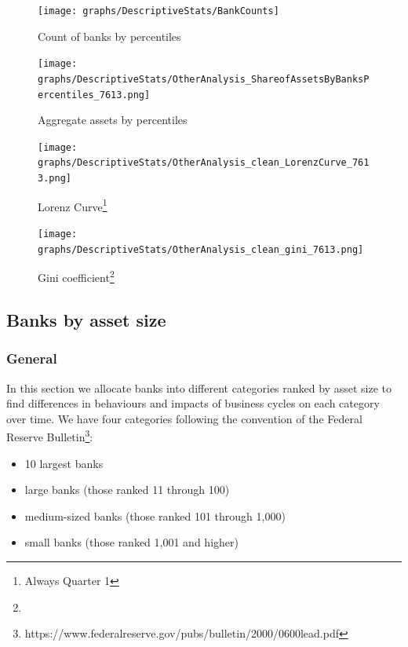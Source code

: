 \documentclass[12pt, a4paper]{article} %
\begin{document}
\begin{figure}[hbtp]
\centering
\caption{Count of banks by percentiles}
\texttt{[image: graphs/DescriptiveStats/BankCounts]}
\label{table:assetsByPercentiles}
\end{figure}


\begin{figure}[hbtp]
\centering
\caption{Aggregate assets by percentiles}
\texttt{[image: graphs/DescriptiveStats/OtherAnalysis\_ShareofAssetsByBanksPercentiles\_7613.png]}
\label{fig:assetsByPercentiles}
\end{figure}


\begin{figure}[hbtp]
\begin{minipage}{\textwidth}
\centering
\caption[1]{Lorenz Curve\footnote{Always Quarter 1} }
\texttt{[image: graphs/DescriptiveStats/OtherAnalysis\_clean\_LorenzCurve\_7613.png]}
\label{fig:lorenz}
\end{minipage}
\end{figure}


\begin{figure}[hbtp]
\begin{minipage}{\textwidth}
\centering
\caption[1]{Gini coefficient\footnote{} }
\texttt{[image: graphs/DescriptiveStats/OtherAnalysis\_clean\_gini\_7613.png]}
\label{fig:gini}
\end{minipage}
\end{figure}




\subsection{Banks by asset size}
\label{sec:banksByAssetSize}

\subsubsection{General}
In this section we allocate banks into different categories ranked by asset size to find differences in behaviours and impacts of business cycles on each category over time. We have four categories following the convention of the Federal Reserve Bulletin\footnote{https://www.federalreserve.gov/pubs/bulletin/2000/0600lead.pdf}:

\begin{itemize}
 \item 10 largest banks
 \item large banks (those ranked
  11 through 100)
 \item medium-sized banks (those ranked 101 through
 1,000)
 \item small banks (those ranked 1,001 and higher)
 \end{itemize} 
\end{document}
